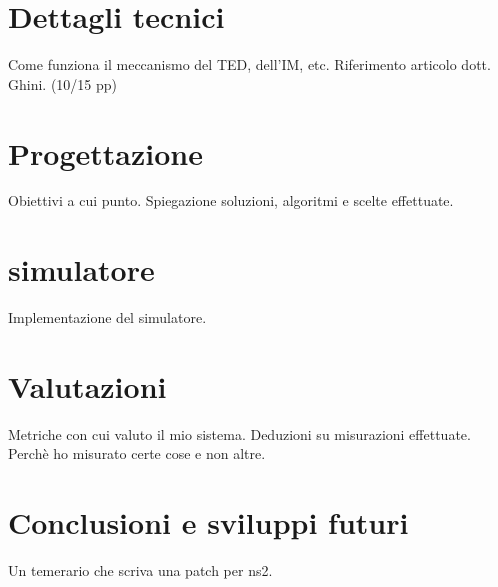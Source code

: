 \documentclass[12pt,a4paper,openright,twoside]{book}
\begin{document}
\chapter{Dettagli tecnici}

Come funziona il meccanismo del TED, dell'IM, etc. Riferimento
articolo dott. Ghini. (10/15 pp)

\chapter{Progettazione}

Obiettivi a cui punto. Spiegazione soluzioni, algoritmi e scelte
effettuate.

\chapter{simulatore}

Implementazione del simulatore.

\chapter{Valutazioni}

Metriche con cui valuto il mio sistema. Deduzioni su misurazioni
effettuate. Perchè ho misurato certe cose e non altre.

\chapter{Conclusioni e sviluppi futuri}

Un temerario che scriva una patch per ns2.
\end{document}
